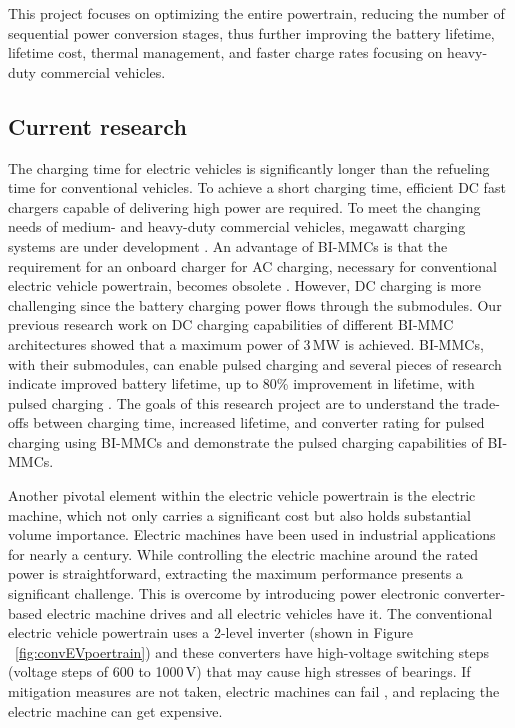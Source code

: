 \documentclass{article}
\begin{document}
This project focuses on optimizing the entire powertrain, reducing the number of sequential power conversion stages, thus further improving the battery lifetime, lifetime cost, thermal management, and faster charge rates focusing on heavy-duty commercial vehicles.

\subsection{Current research}
The charging time for electric vehicles is significantly longer than the refueling time for conventional vehicles. To achieve a short charging time, efficient DC fast chargers capable of delivering high power are required. To meet the changing needs of medium- and heavy-duty commercial vehicles, megawatt charging systems are under development \cite{meintz2022charging}. An advantage of BI-MMCs is that the requirement for an onboard charger for AC charging, necessary for conventional electric vehicle powertrain, becomes obsolete \cite{buberger2021charging}. However, DC charging is more challenging since the battery charging power flows through the submodules. Our previous research work on DC charging capabilities of different BI-MMC architectures \cite{balachandran2023dc} showed that a maximum power of 3\,MW is achieved. BI-MMCs, with their submodules, can enable pulsed charging and several pieces of research indicate improved battery lifetime, up to 80\% improvement in lifetime, with pulsed charging \cite{huang2020review,huang2021effects}. The goals of this research project are to understand the trade-offs between charging time, increased lifetime, and converter rating for pulsed charging using BI-MMCs and demonstrate the pulsed charging capabilities of BI-MMCs.

Another pivotal element within the electric vehicle powertrain is the electric machine, which not only carries a significant cost but also holds substantial volume importance. Electric machines have been used in industrial applications for nearly a century. While controlling the electric machine around the rated power is straightforward, extracting the maximum performance presents a significant challenge. This is overcome by introducing power electronic converter-based electric machine drives and all electric vehicles have it. The conventional electric vehicle powertrain uses a 2-level inverter (shown in Figure ~\ref{fig:convEVpoertrain}) and these converters have high-voltage switching steps (voltage steps of 600 to 1000\,V) that may cause high stresses of bearings. If mitigation measures are not taken, electric machines can fail \cite{bell2001experience}, and replacing the electric machine can get expensive. 
\end{document}
